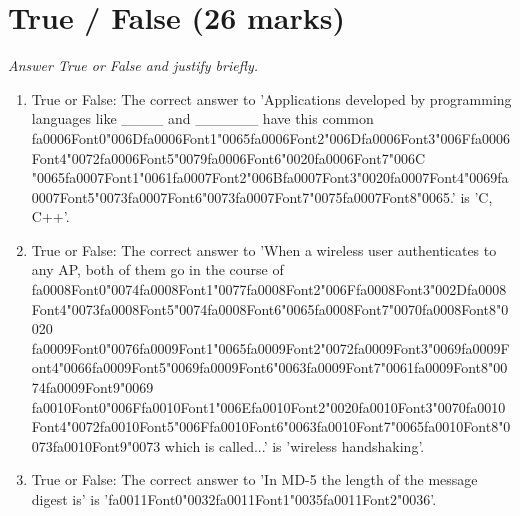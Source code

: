 \documentclass[12pt]{article}
\begin{document}
\section*{True / False (26 marks)}
\textit{Answer True or False and justify briefly.}
\begin{enumerate}[label=\arabic*.]
\item True or False: The correct answer to 'Applications developed by programming languages like \_\_\_\_ and \_\_\_\_\_\_ have this common {\csname fa0006Font0\endcsname\char"006D}{\csname fa0006Font1\endcsname\char"0065}{\csname fa0006Font2\endcsname\char"006D}{\csname fa0006Font3\endcsname\char"006F}{\csname fa0006Font4\endcsname\char"0072}{\csname fa0006Font5\endcsname\char"0079}{\csname fa0006Font6\endcsname\char"0020}{\csname fa0006Font7\endcsname\char"006C} {\char"0065}{\csname fa0007Font1\endcsname\char"0061}{\csname fa0007Font2\endcsname\char"006B}{\csname fa0007Font3\endcsname\char"0020}{\csname fa0007Font4\endcsname\char"0069}{\csname fa0007Font5\endcsname\char"0073}{\csname fa0007Font6\endcsname\char"0073}{\csname fa0007Font7\endcsname\char"0075}{\csname fa0007Font8\endcsname\char"0065}.' is 'C, C++'.
\item True or False: The correct answer to 'When a wireless user authenticates to any AP, both of them go in the course of {\csname fa0008Font0\endcsname\char"0074}{\csname fa0008Font1\endcsname\char"0077}{\csname fa0008Font2\endcsname\char"006F}{\csname fa0008Font3\endcsname\char"002D}{\csname fa0008Font4\endcsname\char"0073}{\csname fa0008Font5\endcsname\char"0074}{\csname fa0008Font6\endcsname\char"0065}{\csname fa0008Font7\endcsname\char"0070}{\csname fa0008Font8\endcsname\char"0020} {\csname fa0009Font0\endcsname\char"0076}{\csname fa0009Font1\endcsname\char"0065}{\csname fa0009Font2\endcsname\char"0072}{\csname fa0009Font3\endcsname\char"0069}{\csname fa0009Font4\endcsname\char"0066}{\csname fa0009Font5\endcsname\char"0069}{\csname fa0009Font6\endcsname\char"0063}{\csname fa0009Font7\endcsname\char"0061}{\csname fa0009Font8\endcsname\char"0074}{\csname fa0009Font9\endcsname\char"0069} {\csname fa0010Font0\endcsname\char"006F}{\csname fa0010Font1\endcsname\char"006E}{\csname fa0010Font2\endcsname\char"0020}{\csname fa0010Font3\endcsname\char"0070}{\csname fa0010Font4\endcsname\char"0072}{\csname fa0010Font5\endcsname\char"006F}{\csname fa0010Font6\endcsname\char"0063}{\csname fa0010Font7\endcsname\char"0065}{\csname fa0010Font8\endcsname\char"0073}{\csname fa0010Font9\endcsname\char"0073} which is called...' is 'wireless handshaking'.
\item True or False: The correct answer to 'In MD-5 the length of the message digest is' is '{\csname fa0011Font0\endcsname\char"0032}{\csname fa0011Font1\endcsname\char"0035}{\csname fa0011Font2\endcsname\char"0036}'.

\end{enumerate}
\end{document}

